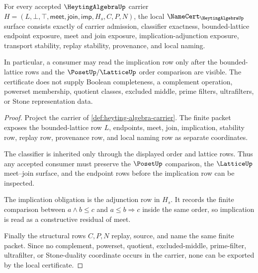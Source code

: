 \begin{theorem}
\label{thm:heyting-algebra-namecert-obligations}
For every accepted $\HeytingAlgebraUp$ carrier $H=(L,\bot,\top,\mathsf{meet},\mathsf{join},\mathsf{imp},H_s,C,P,N)$, the local $\NameCert_{\HeytingAlgebraUp}$ surface consists exactly of carrier admission, classifier exactness, bounded-lattice endpoint exposure, meet and join exposure, implication-adjunction exposure, transport stability, replay stability, provenance, and local naming.

In particular, a consumer may read the implication row only after the bounded-lattice rows and the $\PosetUp/\LatticeUp$ order comparison are visible. The certificate does not supply Boolean completeness, a complement operation, powerset membership, quotient classes, excluded middle, prime filters, ultrafilters, or Stone representation data.
\end{theorem}
\begin{proof}
Project the carrier of \autoref{def:heyting-algebra-carrier}. The finite packet exposes the bounded-lattice row $L$, endpoints, meet, join, implication, stability row, replay row, provenance row, and local naming row as separate coordinates.

The classifier is inherited only through the displayed order and lattice rows. Thus any accepted consumer must preserve the $\PosetUp$ comparison, the $\LatticeUp$ meet--join surface, and the endpoint rows before the implication row can be inspected.

The implication obligation is the adjunction row in $H_s$. It records the finite comparison between $a \wedge b \leq c$ and $a \leq b \Rightarrow c$ inside the same order, so implication is read as a constructive residual of meet.

Finally the structural rows $C,P,N$ replay, source, and name the same finite packet. Since no complement, powerset, quotient, excluded-middle, prime-filter, ultrafilter, or Stone-duality coordinate occurs in the carrier, none can be exported by the local certificate.
\end{proof}

